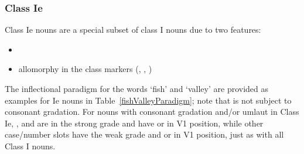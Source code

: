 \subsubsection{Class Ie}\label{NclassIe}
Class Ie nouns are a special subset of class I nouns due to two features:
\begin{itemize}
\item{\jvh{}}
\item{allomorphy in the class markers (, , )}
\end{itemize}
The inflectional paradigm for the words  ‘fish’ and  ‘valley’ are provided as examples for Ie nouns in Table~\vref{fishValleyParadigm}; note that  is not subject to consonant gradation. 
For nouns with consonant gradation and/or umlaut in Class Ie, ,  and  are in the strong grade and have  or  in V1 position, while other case/number slots have the weak grade and  or  in V1 position, just as with all Class I nouns. 
